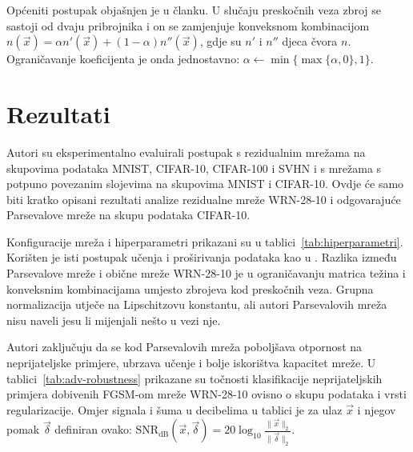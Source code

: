 \documentclass[utf8, seminar, numeric, lmodern]{feri}
\begin{document}
Općeniti postupak objašnjen je u članku. U slučaju preskočnih veza zbroj se sastoji od dvaju pribrojnika i on se zamjenjuje konveksnom kombinacijom
$n(\vec x) = \alpha n'(\vec x) + (1-\alpha)n''(\vec x)$, gdje su $n'$ i $n''$ djeca čvora $n$. Ograničavanje koeficijenta je onda jednostavno: $\alpha\gets\min\{\max\{\alpha, 0\},1\}$.


\section{Rezultati}

Autori su eksperimentalno evaluirali postupak s rezidualnim mrežama \cite{he15-resnet,he16-resnet-imdrn,zagoruyko16-wrn} na skupovima podataka MNIST, CIFAR-10, CIFAR-100 i SVHN i s mrežama s potpuno povezanim slojevima na skupovima MNIST i CIFAR-10. Ovdje će samo biti kratko opisani rezultati analize rezidualne mreže WRN-28-10 \cite{zagoruyko16-wrn} i odgovarajuće Parsevalove mreže na skupu podataka CIFAR-10.

Konfiguracije mreža i hiperparametri prikazani su u tablici~\ref{tab:hiperparametri}. Korišten je isti postupak učenja i proširivanja podataka kao u \cite{zagoruyko16-wrn}. Razlika između Parsevalove mreže i obične mreže WRN-28-10 je u ograničavanju matrica težina i konveksnim kombinacijama umjesto zbrojeva kod preskočnih veza. Grupna normalizacija utječe na Lipschitzovu konstantu, ali autori Parsevalovih mreža nisu naveli jesu li mijenjali nešto u vezi nje.

Autori zaključuju da se kod Parsevalovih mreža poboljšava otpornost na neprijateljske primjere, ubrzava učenje i bolje iskorištva kapacitet mreže. U tablici~\ref{tab:adv-robustness} prikazane su točnosti klasifikacije neprijateljskih primjera dobivenih FGSM-om mreže WRN-28-10 ovisno o skupu podataka i vrsti regularizacije. Omjer signala i šuma u decibelima u tablici je za ulaz $\vec x$ i njegov pomak $\vec \delta$ definiran ovako: $\mathrm{SNR}_\mathrm{dB}(\vec x, \vec{\delta}) = 20 \log_{10} \frac{\lVert \vec x\rVert_2}{\lVert\vec \delta\rVert_2}$.
\end{document}
